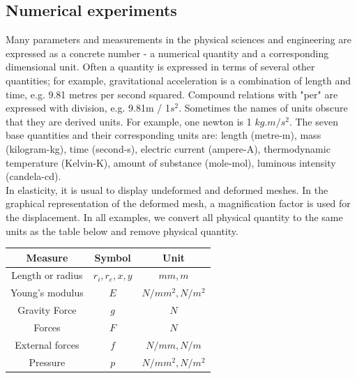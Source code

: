 \documentclass[notitlepage,a4paper,fleqn,9pt]{icmfarticle}
\begin{document}
\begin{multicols}{2}
\section{Numerical experiments}
\label{sec:result}
Many parameters and measurements in the physical sciences and engineering are expressed as a concrete number - a numerical quantity and a corresponding dimensional unit. Often a quantity is expressed in terms of several other quantities; for example, gravitational acceleration is a combination of length and time, e.g. 9.81 metres per second squared. Compound relations with "per" are expressed with division, e.g. 9.81m / 1$s^2$. Sometimes the names of units obscure that they are derived units. For example, one newton is 1 $kg.m/s^2$. The seven base quantities and their corresponding units are: length (metre-m), mass (kilogram-kg), time (second-s), electric current (ampere-A), thermodynamic temperature (Kelvin-K), amount of substance (mole-mol), luminous intensity (candela-cd). \\
In elasticity, it is usual to display undeformed and deformed meshes. In the graphical representation of the deformed mesh, a magnification factor is used for the displacement. In all examples, we convert all physical quantity to the same units as the table below and remove physical quantity.

\begin{center}
\begin{tabular}{ |c|c|c| } 
 \hline
 Measure & Symbol & Unit \\ 
 \hline
 Length or radius & $r_i, r_e, x, y$ & $mm, m$ \\ 
 Young's modulus & $E$ & $N/mm^2, N/m^2$ \\ 
 Gravity Force & $g$ & $N$ \\ 
 Forces & $F$ & $N$ \\ 
 External forces & $f$ & $N/mm, N/m$ \\ 
 Pressure & $p$ & $N/mm^2, N/m^2$ \\ 
 \hline
\end{tabular}
\end{center}


\end{multicols}
\end{document}

